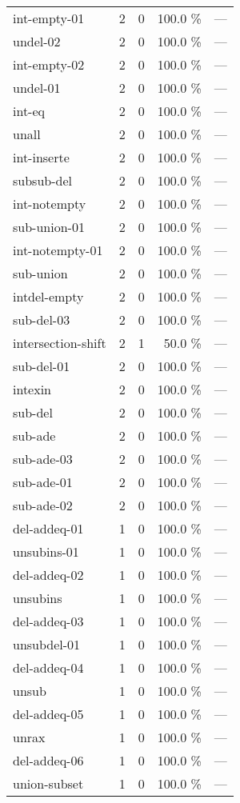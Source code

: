\documentclass[a4paper]{article}
\begin{document}
\begin{supertabular}{l|r|r|r|r}
int-empty-01 & 2 & 0 & 100.0 \% & ---\\
undel-02 & 2 & 0 & 100.0 \% & ---\\
int-empty-02 & 2 & 0 & 100.0 \% & ---\\
undel-01 & 2 & 0 & 100.0 \% & ---\\
int-eq & 2 & 0 & 100.0 \% & ---\\
unall & 2 & 0 & 100.0 \% & ---\\
int-inserte & 2 & 0 & 100.0 \% & ---\\
subsub-del & 2 & 0 & 100.0 \% & ---\\
int-notempty & 2 & 0 & 100.0 \% & ---\\
sub-union-01 & 2 & 0 & 100.0 \% & ---\\
int-notempty-01 & 2 & 0 & 100.0 \% & ---\\
sub-union & 2 & 0 & 100.0 \% & ---\\
intdel-empty & 2 & 0 & 100.0 \% & ---\\
sub-del-03 & 2 & 0 & 100.0 \% & ---\\
intersection-shift & 2 & 1 & 50.0 \% & ---\\
sub-del-01 & 2 & 0 & 100.0 \% & ---\\
intexin & 2 & 0 & 100.0 \% & ---\\
sub-del & 2 & 0 & 100.0 \% & ---\\
sub-ade & 2 & 0 & 100.0 \% & ---\\
sub-ade-03 & 2 & 0 & 100.0 \% & ---\\
sub-ade-01 & 2 & 0 & 100.0 \% & ---\\
sub-ade-02 & 2 & 0 & 100.0 \% & ---\\
del-addeq-01 & 1 & 0 & 100.0 \% & ---\\
unsubins-01 & 1 & 0 & 100.0 \% & ---\\
del-addeq-02 & 1 & 0 & 100.0 \% & ---\\
unsubins & 1 & 0 & 100.0 \% & ---\\
del-addeq-03 & 1 & 0 & 100.0 \% & ---\\
unsubdel-01 & 1 & 0 & 100.0 \% & ---\\
del-addeq-04 & 1 & 0 & 100.0 \% & ---\\
unsub & 1 & 0 & 100.0 \% & ---\\
del-addeq-05 & 1 & 0 & 100.0 \% & ---\\
unrax & 1 & 0 & 100.0 \% & ---\\
del-addeq-06 & 1 & 0 & 100.0 \% & ---\\
union-subset & 1 & 0 & 100.0 \% & ---\\

\end{supertabular}
\end{document}
